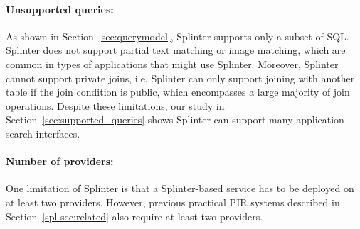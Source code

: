 
%


\paragraph{Unsupported queries:}
As shown in Section~\ref{sec:querymodel}, Splinter supports only a subset of SQL.
Splinter does not support partial text matching or image matching, which are common in types of applications
that might use Splinter. Moreover, Splinter cannot support private joins, i.e. Splinter can only support joining with 
another table if the join condition is public, which encompasses a large majority of join operations. 
Despite these limitations, our study in Section~\ref{sec:supported_queries} 
shows Splinter can support many application search interfaces.

\paragraph{Number of providers:} 
One limitation of Splinter is that 
a Splinter-based service has 
to be deployed on at least two providers. 
However, previous practical PIR systems described in Section~\ref{spl-sec:related}
also require at least two providers. 

